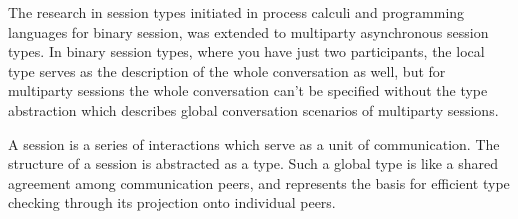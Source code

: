 \documentclass[a4paper,12pt,oneside,fleqn]{book} %
\begin{document}
The research in session types initiated in process calculi and programming
languages for binary session, was extended to multiparty asynchronous
session types. In binary session types, where you have just two
participants, the local type serves as the description of the whole
conversation as well, but for multiparty sessions the whole conversation
can't be specified without the type abstraction which describes global
conversation scenarios of multiparty sessions.~\cite{DBLP:journals/jacm/HondaYC16}

A session is a series of interactions which serve as a unit of
communication. The structure of a session is abstracted as a type. Such a
global type is like a shared agreement among communication peers, and
represents the basis for efficient type checking through its projection
onto individual peers.
\end{document}

